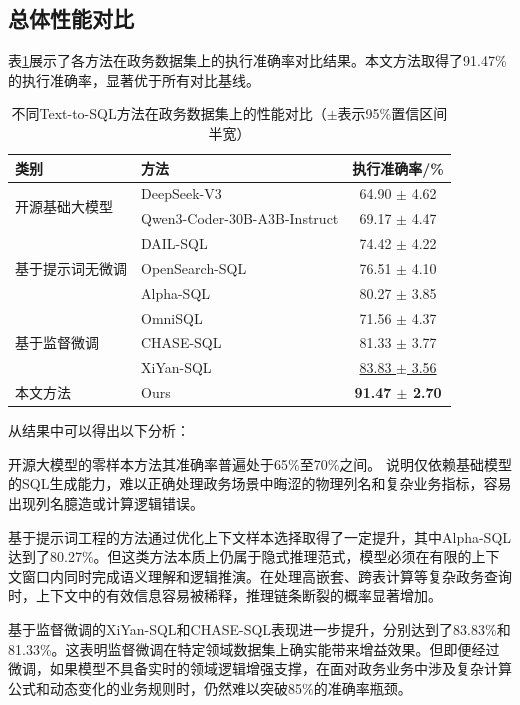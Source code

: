 \subsection{总体性能对比}

表\ref{tab:main_results}展示了各方法在政务数据集上的执行准确率对比结果。本文方法取得了91.47\%的执行准确率，显著优于所有对比基线。
\begin{table}[htbp]
	\setlength{\abovecaptionskip}{5pt}
	\setlength{\belowcaptionskip}{5pt}
	\caption{不同Text-to-SQL方法在政务数据集上的性能对比（$\pm$表示95\%置信区间半宽）}
	\label{tab:main_results}
	\centering
	\begin{tabular}{llc}
		\toprule
		类别 & 方法 & 执行准确率/\% \\
		\midrule
		\multirow{2}{*}{开源基础大模型} & DeepSeek-V3 & 64.90 $\pm$ 4.62 \\
		& Qwen3-Coder-30B-A3B-Instruct & 69.17 $\pm$ 4.47 \\
		\midrule
		\multirow{3}{*}{基于提示词无微调} & DAIL-SQL & 74.42 $\pm$ 4.22 \\
		& OpenSearch-SQL & 76.51 $\pm$ 4.10 \\
		& Alpha-SQL & 80.27 $\pm$ 3.85 \\
		\midrule
		\multirow{3}{*}{基于监督微调} & OmniSQL & 71.56 $\pm$ 4.37 \\
		& CHASE-SQL & 81.33 $\pm$ 3.77 \\
		& XiYan-SQL & \underline{83.83 $\pm$ 3.56} \\
		\midrule
		本文方法 & Ours & \textbf{91.47 $\pm$ 2.70} \\
		\bottomrule
	\end{tabular}
\end{table}

从结果中可以得出以下分析：

开源大模型的零样本方法其准确率普遍处于65\%至70\%之间。
说明仅依赖基础模型的SQL生成能力，难以正确处理政务场景中晦涩的物理列名和复杂业务指标，容易出现列名臆造或计算逻辑错误。

基于提示词工程的方法通过优化上下文样本选择取得了一定提升，其中Alpha-SQL达到了80.27\%。但这类方法本质上仍属于隐式推理范式，模型必须在有限的上下文窗口内同时完成语义理解和逻辑推演。在处理高嵌套、跨表计算等复杂政务查询时，上下文中的有效信息容易被稀释，推理链条断裂的概率显著增加。

基于监督微调的XiYan-SQL和CHASE-SQL表现进一步提升，分别达到了83.83\%和81.33\%。这表明监督微调在特定领域数据集上确实能带来增益效果。但即便经过微调，如果模型不具备实时的领域逻辑增强支撑，在面对政务业务中涉及复杂计算公式和动态变化的业务规则时，仍然难以突破85\%的准确率瓶颈。

